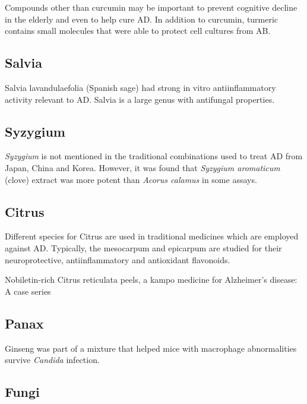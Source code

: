 \documentclass[twocolumn]{article}
\begin{document}
Compounds other than curcumin may be important to
prevent cognitive decline in the elderly
and even to help cure AD.
In addition to curcumin, turmeric contains small molecules
that were able to protect cell cultures from AB.
\cite{park2002discovery}



\subsection{Salvia}

Salvia lavandulaefolia (Spanish sage)
had strong in vitro antiinflammatory activity relevant to AD.
\cite{perry2001vitro}
Salvia is a large genus with antifungal properties.
\cite{yuce2014essential, tabanca2006chemical}



\subsection{Syzygium}

\textit{Syzygium} is not mentioned in the traditional combinations
used to treat AD
from Japan, China and Korea.
However, it was found that \textit{Syzygium aromaticum} (clove)
extract was more potent than \textit{Acorus calamus}
in some assays.
\cite{ขจร2001fungistatic}




\subsection{Citrus}

Different species for Citrus are used in traditional medicines
which are employed against AD.
Typically, the mesocarpum and epicarpum
are studied for their neuroprotective, antiinflammatory and antioxidant
flavonoids.
\cite{?}

Nobiletin-rich Citrus reticulata peels,
a kampo medicine for Alzheimer's disease: A case series
\cite{seki2013nobiletin}


\subsection{Panax}

Ginseng was part of a mixture that
helped mice with macrophage abnormalities
survive \textit{Candida} infection.
\cite{akagawa1996protection}


\subsection{Fungi}
\end{document}
